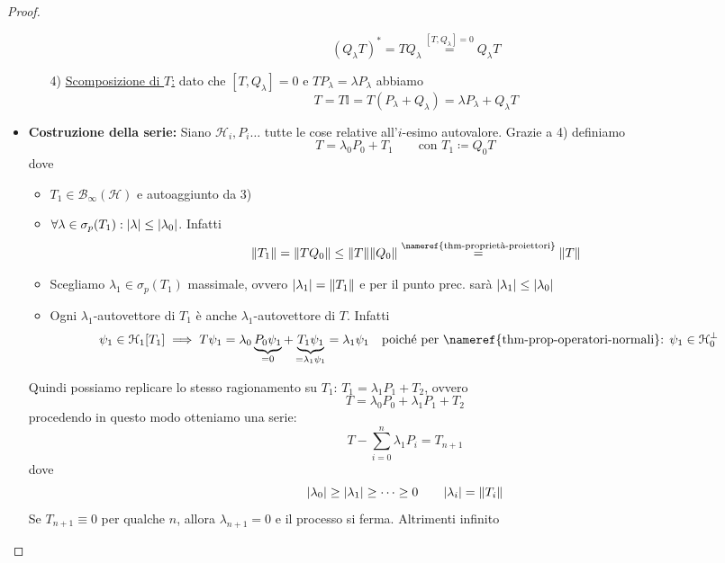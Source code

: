 \documentclass[a4paper,10pt]{article}
\theoremstyle{definition}
\newcommand{\hil}{\mathcal{H}} %
\theoremstyle{indentdefinition}
\theoremstyle{indenttheorem}
\theoremstyle{myremark}
\theoremstyle{indentgeneral}
\begin{document}
\begin{proof}
\begin{itemize}
\begin{itemize}
        $$(Q_\lambda T)^*=TQ_\lambda\overset{[T,Q_\lambda]=0}{=}Q_\lambda T$$
        \item[4)] \underline{Scomposizione di $T$:} dato che $[T,Q_\lambda]=0$  e $TP_\lambda =\lambda P_\lambda $ abbiamo
        $$\boxed{T=T\mathbb{I}=T(P_\lambda +Q_\lambda )=\lambda P_\lambda +Q_\lambda T}$$
    \end{itemize}
    \item \textbf{Costruzione della serie:} 
    Siano $\hil_i,P_i\dots$ tutte le cose relative all'$i$-esimo autovalore. Grazie a 4) definiamo
    $$\boxed{T=\lambda_0P_0+T_1\qquad \text{con }T_1\coloneqq Q_0T}$$
    dove
    \begin{itemize}
        \item $T_1\in\mathcal{B}_\infty(\hil)$ e autoaggiunto da 3)  
        \item $\forall \lambda\in\sigma_p(T_1):\abs{\lambda}\le\abs{\lambda_0}$. Infatti
        $$\norm{T_1}=\norm{TQ_0}\le \norm{T}\norm{Q_0}\overset{\text{\nameref{thm-proprietà-proiettori}}}{=}\norm{T}$$
        \item Scegliamo $\lambda_1\in\sigma_p(T_1)$ massimale, ovvero $\abs{\lambda_1}=\norm{T_1}$ e per il punto prec. sarà $\abs{\lambda_1}\le \abs{\lambda_0}$
        \item Ogni $\lambda_1$-autovettore di $T_1$ è anche  $\lambda_1$-autovettore di $T$. Infatti
        \begin{align*}
            \psi_1\in\hil_1[T_1]&\implies T\psi_1=\lambda_0\underbrace{P_0\psi_1}_{=0}+\underbrace{T_1\psi_1}_{=\lambda_1\psi_1}=\lambda_1\psi_1 \quad \text{poiché per \nameref{thm-prop-operatori-normali}: }\psi_1\in\hil_0^\perp
        \end{align*}
    \end{itemize}
Quindi possiamo replicare lo stesso ragionamento su $T_1$: $T_1=\lambda_1P_1+T_2$, ovvero
$$\boxed{T=\lambda_0P_0+\lambda_1P_1+T_2}$$
procedendo in questo modo otteniamo una serie:
$$\boxed{T-\sum_{i=0}^n\lambda_1P_i=T_{n+1}}$$
dove 
    $$\abs{\lambda_0}\ge\abs{\lambda_1}\ge\dots\ge0 \qquad \abs{\lambda_i}=\norm{T_i}$$
    Se $T_{n+1}\equiv 0$ per qualche $n$, allora $\lambda_{n+1}=0$ e il processo si ferma. Altrimenti infinito
    

\end{itemize}
\end{proof}
\end{document}
